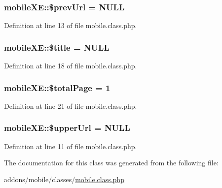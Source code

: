 \hypertarget{classmobileXE_acbc08c3fe06a6a5aaae6cbdc8738559f}{
\subsubsection[{\$prev\+Url}]{\setlength{\rightskip}{0pt plus 5cm}mobile\+X\+E\+::\$prev\+Url = N\+U\+L\+L}}\label{classmobileXE_acbc08c3fe06a6a5aaae6cbdc8738559f}


Definition at line 13 of file mobile.\+class.\+php.

\hypertarget{classmobileXE_aeb2ef82029883fd60174e3d0e9f7dcc3}{
\subsubsection[{\$title}]{\setlength{\rightskip}{0pt plus 5cm}mobile\+X\+E\+::\$title = N\+U\+L\+L}}\label{classmobileXE_aeb2ef82029883fd60174e3d0e9f7dcc3}


Definition at line 18 of file mobile.\+class.\+php.

\hypertarget{classmobileXE_a0d7bcada3689f84f67337d02c8dd6f21}{
\subsubsection[{\$total\+Page}]{\setlength{\rightskip}{0pt plus 5cm}mobile\+X\+E\+::\$total\+Page = 1}}\label{classmobileXE_a0d7bcada3689f84f67337d02c8dd6f21}


Definition at line 21 of file mobile.\+class.\+php.

\hypertarget{classmobileXE_a643b9ca5393066afea26819e4f1cf115}{
\subsubsection[{\$upper\+Url}]{\setlength{\rightskip}{0pt plus 5cm}mobile\+X\+E\+::\$upper\+Url = N\+U\+L\+L}}\label{classmobileXE_a643b9ca5393066afea26819e4f1cf115}


Definition at line 11 of file mobile.\+class.\+php.



The documentation for this class was generated from the following file\+:\begin{DoxyCompactItemize}
\item 
addons/mobile/classes/\hyperlink{addons_2mobile_2classes_2mobile_8class_8php}{mobile.\+class.\+php}\end{DoxyCompactItemize}
